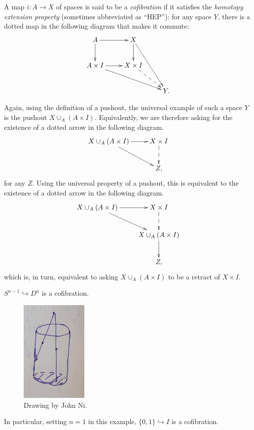 \begin{definition}\label{cofibration}
    A map $i:A\to X$ of spaces is said to be a \emph{cofibration} if it satisfies the
    \emph{homotopy extension property} (sometimes abbreviated as ``HEP''):
    for any space $Y$, there is a dotted map in the following diagram that makes it commute:
    \begin{equation*}
    \xymatrix{
	A\ar[r]\ar[d] & X\ar[d]\ar[ddr] & \\
	A\times I\ar[r]\ar[drr] & X\times I\ar@{-->}[dr] & \\
	& & Y.
    }
    \end{equation*}
\end{definition}

Again, using the definition of a pushout, the universal example of such a space $Y$ is the pushout $X\cup_A (A\times I)$.
Equivalently, we are therefore asking for the existence of a dotted arrow in the following diagram.
\begin{equation*}
    \xymatrix{
	X\cup_A (A\times I)\ar[r]\ar[dr] & X\times I\ar@{-->}[d]\\
	& Z,
    }
\end{equation*}
for any $Z$.
Using the universal property of a pushout, this is equivalent to the existence of a dotted arrow in the following diagram.
\begin{equation*}
    \xymatrix{
	X\cup_A (A\times I)\ar[r]\ar[dr] & X\times I\ar@{-->}[d]\\
	& X\cup_A(A\times I)\ar[d]\\
	& Z,
    }
\end{equation*}
which is, in turn, equivalent to asking $X\cup_A (A\times I)$ to be a retract of $X\times I$.

\begin{example}\label{intervalcofib}
    $S^{n-1}\hookrightarrow D^n$ is a cofibration.
    \begin{figure}[H]
	\centering
	\includegraphics[scale=0.75]{assets/retract-cofibration}
	\caption{Drawing by John Ni.}
    \end{figure}
    In particular, setting $n=1$ in this example, $\{0,1\}\hookrightarrow I$ is a cofibration.
\end{example}

